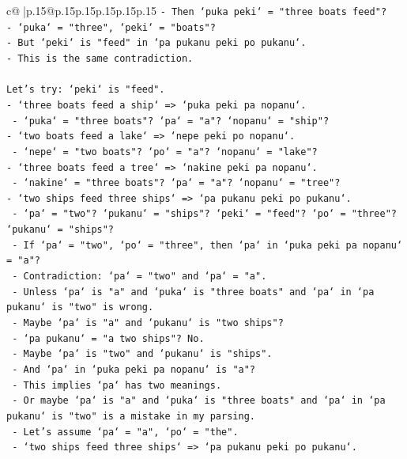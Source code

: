 \documentclass{article}
\begin{document}
{\begin{supertabular}{c@{$\;$}|p{.15\linewidth}@{}p{.15\linewidth}p{.15\linewidth}p{.15\linewidth}p{.15\linewidth}p{.15\linewidth}}
{{{\texttt{{-} Then `puka peki` = "three boats feed"?} \\
\texttt{{-} `puka` = "three", `peki` = "boats"?} \\
\texttt{{-} But `peki` is "feed" in `pa pukanu peki po pukanu`.} \\
\texttt{{-} This is the same contradiction.} \\
\\ 
\texttt{Let's try: `peki` is "feed".} \\
\texttt{{-} `three boats feed a ship` => `puka peki pa nopanu`.} \\
\texttt{  {-} `puka` = "three boats"? `pa` = "a"? `nopanu` = "ship"?} \\
\texttt{{-} `two boats feed a lake` => `nepe peki po nopanu`.} \\
\texttt{  {-} `nepe` = "two boats"? `po` = "a"? `nopanu` = "lake"?} \\
\texttt{{-} `three boats feed a tree` => `nakine peki pa nopanu`.} \\
\texttt{  {-} `nakine` = "three boats"? `pa` = "a"? `nopanu` = "tree"?} \\
\texttt{{-} `two ships feed three ships` => `pa pukanu peki po pukanu`.} \\
\texttt{  {-} `pa` = "two"? `pukanu` = "ships"? `peki` = "feed"? `po` = "three"? `pukanu` = "ships"?} \\
\texttt{  {-} If `pa` = "two", `po` = "three", then `pa` in `puka peki pa nopanu` = "a"?} \\
\texttt{  {-} Contradiction: `pa` = "two" and `pa` = "a".} \\
\texttt{  {-} Unless `pa` is "a" and `puka` is "three boats" and `pa` in `pa pukanu` is "two" is wrong.} \\
\texttt{  {-} Maybe `pa` is "a" and `pukanu` is "two ships"?} \\
\texttt{  {-} `pa pukanu` = "a two ships"? No.} \\
\texttt{  {-} Maybe `pa` is "two" and `pukanu` is "ships".} \\
\texttt{  {-} And `pa` in `puka peki pa nopanu` is "a"?} \\
\texttt{  {-} This implies `pa` has two meanings.} \\
\texttt{  {-} Or maybe `pa` is "a" and `puka` is "three boats" and `pa` in `pa pukanu` is "two" is a mistake in my parsing.} \\
\texttt{  {-} Let's assume `pa` = "a", `po` = "the".} \\
\texttt{  {-} `two ships feed three ships` => `pa pukanu peki po pukanu`.} \\
}}}
\end{supertabular}}
\end{document}
